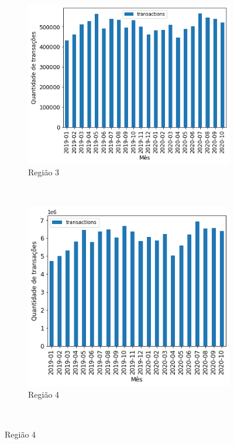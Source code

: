 \begin{figure}[htb]
\begin{subfigure}[b]{0.45\textwidth}
    \end{subfigure} ~ \\
    \begin{subfigure}[b]{0.45\textwidth}
        \includegraphics[scale=0.45]{images/base-de-dados-12.3-qtde-transacoes-mensal-por-regiao.png}
        \caption{Região 3}
        \label{fig:pandemia:descritiva-12.3-qtde-transacoes-mensal-por-regiao}
    \end{subfigure} ~ \quad
    \begin{subfigure}[b]{0.45\textwidth}
        \includegraphics[scale=0.45]{images/base-de-dados-12.4-qtde-transacoes-mensal-por-regiao.png}
        \caption{Região 4}
        \label{fig:pandemia:descritiva-12.4-qtde-transacoes-mensal-por-regiao}
    \end{subfigure} ~ \\

\end{figure}
